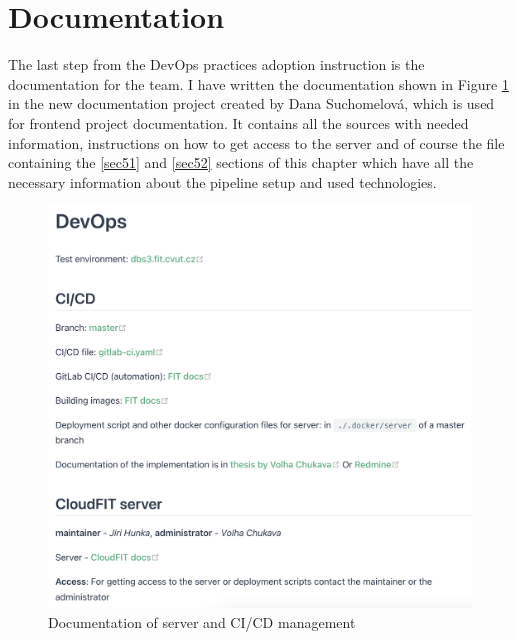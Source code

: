 \section{Documentation} The last step from the DevOps practices adoption instruction is the documentation for the team. I have written the documentation shown in Figure \ref{doc} in the new documentation project created by Dana Suchomelová, which is used for frontend project documentation. It contains all the sources with needed information, instructions on how to get access to the server and of course the file containing the \ref{sec51} and \ref{sec52} sections of this chapter which have all the necessary information about the pipeline setup and used technologies. 

\begin{figure}[ht]
\centering
\includegraphics[scale=0.5]{../png/docs.png}
\caption{Documentation of server and CI/CD management}
\label{doc}
\end{figure}
